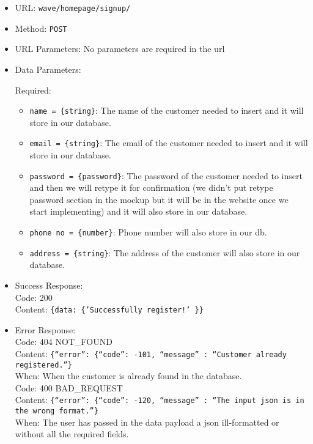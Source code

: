 \begin{itemize}
    \item URL: \texttt{wave/homepage/signup/}
    \item Method: \texttt{POST}
    \item URL Parameters: No parameters are required in the url
    \item Data Parameters:
    
    Required:
    
    \begin{itemize}
        \item \texttt{name = \{string\}}: The name of the customer needed to insert and it will store in our database.
        \item \texttt{email = \{string\}}: The email of the customer needed to insert and it will store in our database.
        \item \texttt{password = \{password\}}: The password of the customer needed to insert and then we will retype it for confirmation (we didn't put retype password section in the mockup but it will be in the website once we start implementing) and it will also store in our database.
        \item \texttt{phone no = \{number\}}: Phone number will also store in our db.
        \item \texttt{address = \{string\}}: The address of the customer will also store in our database.
    \end{itemize}
    
    
    \item Success Response:\\

    Code: 200\\
    Content: \texttt{\{data: \{'Successfully register!' \}\}}

    \item Error Response:\\
    Code: 404 NOT\_FOUND\\
    Content: \texttt{\{``error'': \{``code'': -101, ``message'' : ``Customer already registered.''\}}\\
    When: When the customer is already found in the database.\\
    
    Code: 400 BAD\_REQUEST\\
    Content: \texttt{\{``error'': \{``code'': -120, ``message'' : ``The input json is in the wrong format.''\}}\\
    When: The user has passed in the data payload a json ill-formatted or without all the required fields.\\

\end{itemize}



